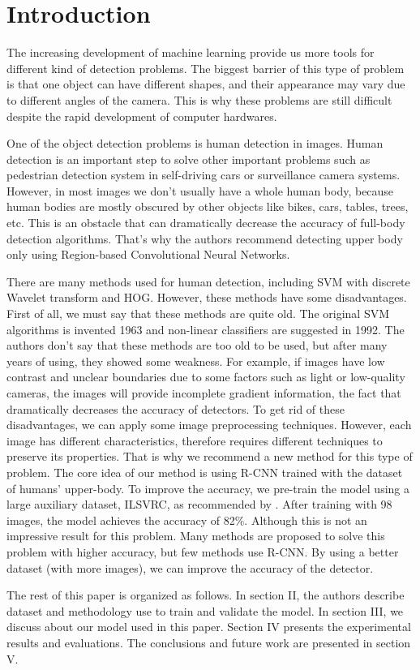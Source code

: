 \section{Introduction}
The increasing development of machine learning provide us more tools for different kind of detection problems. The biggest barrier of this type of problem is that one object can have different shapes, and their appearance may vary due to different angles of the camera. This is why these problems are still difficult despite the rapid development of computer hardwares.

One of the object detection problems is human detection in images. Human detection is an important step to solve other important problems such as pedestrian detection system in self-driving cars or surveillance camera systems. However, in most images we don't usually have a whole human body, because human bodies are mostly obscured by other objects like bikes, cars, tables, trees, etc. This is an obstacle that can dramatically decrease the accuracy of full-body detection algorithms. That's why the authors recommend detecting upper body only using Region-based Convolutional Neural Networks.

There are many methods used for human detection, including SVM with discrete Wavelet transform \cite{wavelet} and HOG\cite{hog}. However, these methods have some disadvantages. First of all, we must say that these methods are quite old. The original SVM algorithms is invented 1963 and non-linear classifiers are suggested in 1992.\cite{svm} The authors don't say that these methods are too old to be used, but after many years of using, they showed some weakness.
For example, if images have low contrast and unclear boundaries due to some factors such as light or low-quality cameras, the images will provide incomplete gradient information, the fact that dramatically decreases the accuracy of detectors. To get rid of these disadvantages, we can apply some image preprocessing techniques. However, each image has different characteristics, therefore requires different techniques to preserve its properties. 
That is why we recommend a new method for this type of problem. The core idea of our method is using R-CNN trained with the dataset of humans' upper-body. To improve the accuracy, we pre-train the model using a large auxiliary dataset, ILSVRC, as recommended by \cite{rcnn}. After training with 98 images, the model achieves the accuracy of 82\%. Although this is not an impressive result for this problem. Many methods are proposed to solve this problem with higher accuracy, but few methods use R-CNN. By using a better dataset (with more images), we can improve the accuracy of the detector.

The rest of this paper is organized as follows. In section II, the authors describe dataset and methodology use to train and validate the model. In section III, we discuss about our model used in this paper. Section IV presents the experimental results and evaluations. The conclusions and future work are presented in section V. 